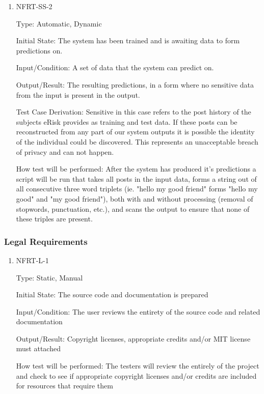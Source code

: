 \documentclass[12pt, titlepage]{article}
\begin{document}
\begin{enumerate}

	\item{NFRT-SS-2\\}
	
	Type: Automatic, Dynamic
						
	Initial State: The system has been trained and is awaiting data to form predictions on.
						
	Input/Condition: A set of data that the system can predict on.
						
	Output/Result: The resulting predictions, in a form where no sensitive data from the input is present in the output.
	
	Test Case Derivation: Sensitive in this case refers to the post history of the subjects eRisk provides as training and test data. If these posts can be reconstructed from any part of our system outputs it is possible the identity of the individual could be discovered. This represents an unacceptable breach of privacy and can not happen.
						
	How test will be performed: After the system has produced it's predictions a script will be run that takes all posts in the input data, forms a string out of all consecutive three word triplets (ie. "hello my good friend" forms "hello my good" and "my good friend"), both with and without processing (removal of stopwords, punctuation, etc.), and scans the output to ensure that none of these triples are present.
	
\end{enumerate}

\subsubsection{Legal Requirements}

\begin{enumerate}

\item{NFRT-L-1\\}

Type: Static, Manual
					
Initial State: The source code and documentation is prepared
					
Input/Condition: The user reviews the entirety of the source code and related documentation
					
Output/Result: Copyright licenses, appropriate credits and/or MIT license must attached
					
How test will be performed: The testers will review the entirely of the project and check to see if appropriate copyright licenses and/or credits are included for resources that require them

\end{enumerate}
\end{document}
